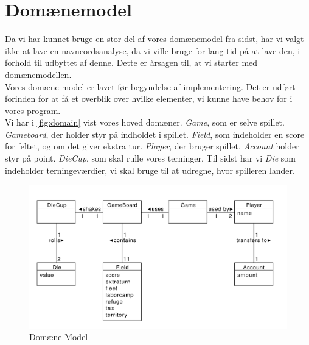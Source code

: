 \section{Domænemodel}
Da vi har kunnet bruge en stor del af vores domænemodel fra sidst, har vi valgt ikke at lave en navneordsanalyse, da vi ville bruge for lang tid på at lave den, i forhold til udbyttet af denne. Dette er årsagen til, at vi starter med domænemodellen.
\\

Vores domæne model er lavet før begyndelse af implementering. Det er udført forinden for at få et overblik over hvilke elementer, vi kunne have behov for i vores program. 
\\


Vi har i \vref{fig:domain} vist vores hoved domæner. \textit{Game}, som er selve spillet. \textit{Gameboard}, der holder styr på indholdet i spillet. \textit{Field}, som indeholder en score for feltet, og om det giver ekstra tur. \textit{Player}, der bruger spillet. \textit{Account} holder styr på point. \textit{DieCup}, som skal rulle vores terninger. Til sidst har vi \textit{Die} som indeholder terningeværdier, vi skal bruge til at udregne, hvor spilleren lander.

\begin{figure}[!ht]
    \centering
    \includegraphics[width=1\textwidth]{Domainmodel.pdf}
    \caption[<Text for the list of figures>]{Domæne Model}
    \label{fig:domain}
\end{figure}